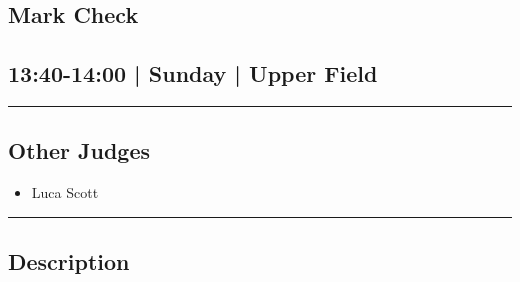 \documentclass[10pt, A5]{article}
\begin{document}
		\begin{framed}
			\begin{minipage}{\textwidth}

			\setcounter{section}{115}
							\section{Mark Check}
						
			\subsection*{13:40-14:00 | Sunday | Upper Field}

			\vspace{0.25cm}
			\hrule
			\vspace{0.25cm}


			\subsection*{Other Judges}
							

				\begin{multicols}{2}

			\begin{itemize}
											\item Luca Scott
								\end{itemize}

			\vfill\null
			\columnbreak

			\begin{itemize}
								\end{itemize}

			\vfill\null

			\end{multicols}

			\vspace{0.25cm}
			\hrule
			\vspace{0.25cm}

			\begin{minipage}{\textwidth}
			\subsection*{\faListAlt \: Description}
			
			\end{minipage}


	\end{minipage}
	\end{framed}

	
\end{document}
